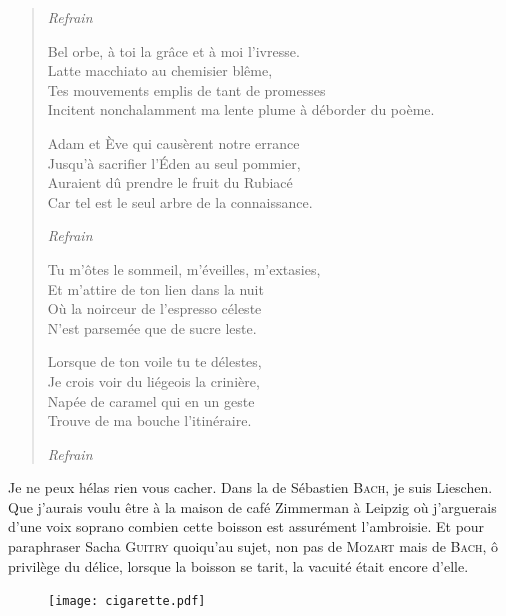 \begin{verse}
  \emph{Refrain}  %

  Bel orbe, à toi la grâce et à moi l’ivresse.\\ 
  Latte macchiato au chemisier blême,\\ 
  Tes mouvements emplis de tant de promesses\\ 
  Incitent nonchalamment ma lente plume à déborder du poème. 

  Adam et Ève qui causèrent notre errance\\ 
  Jusqu’à sacrifier l’Éden au seul pommier,\\ 
  Auraient dû prendre le fruit du Rubiacé\\ 
  Car tel est le seul arbre de la connaissance. 

  \emph{Refrain}  %

  Tu m’ôtes le sommeil, m’éveilles, m’extasies,\\ 
  Et m’attire de ton lien dans la nuit\\ 
  Où la noirceur de l’espresso céleste\\ 
  N’est parsemée que de sucre leste. 

  Lorsque de ton voile tu te délestes,\\ 
  Je crois voir du liégeois la crinière,\\ 
  Napée de caramel qui en un geste\\ 
  Trouve de ma bouche l’itinéraire. 

  \emph{Refrain}
\end{verse}


\begin{prose}
  Je ne peux hélas rien vous cacher. Dans la  de Sébastien \textsc{Bach}, je suis Lieschen. Que j’aurais voulu être à la maison de café Zimmerman à Leipzig où j’arguerais d’une voix soprano combien  cette boisson est assurément l’ambroisie. Et pour paraphraser Sacha \textsc{Guitry} quoiqu’au sujet, non pas de \textsc{Mozart} mais de \textsc{Bach}, ô privilège du délice, lorsque la boisson se tarit, la vacuité était encore d’elle.
\end{prose}

\begin{figure}[h]
  \centering
  \texttt{[image: cigarette.pdf]}
  \captionsetup{labelformat=empty}
  \caption[Idéotexte de la ]{}
\end{figure}

